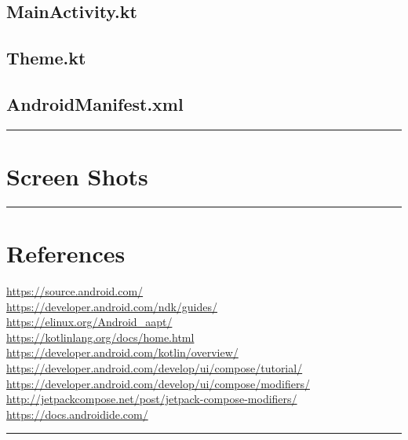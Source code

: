 \documentclass[12pt,oneside]{book}
\begin{document}
\section{MainActivity.kt}
\newpage
\section{Theme.kt}
\newpage
\section{AndroidManifest.xml}
\vfill \rule{\textwidth}{0.4pt}

\chapter{Screen Shots}
\vfill \rule{\textwidth}{0.4pt}

\chapter{References}
    \url{https://source.android.com/} \\
    \url{https://developer.android.com/ndk/guides/} \\
    \url{https://elinux.org/Android_aapt/} \\
    \url{https://kotlinlang.org/docs/home.html} \\
    \url{https://developer.android.com/kotlin/overview/} \\
    \url{https://developer.android.com/develop/ui/compose/tutorial/} \\
    \url{https://developer.android.com/develop/ui/compose/modifiers/} \\
    \url{http://jetpackcompose.net/post/jetpack-compose-modifiers/} \\
    \url{https://docs.androidide.com/}
\vfill \rule{\textwidth}{0.4pt}
\end{document}
